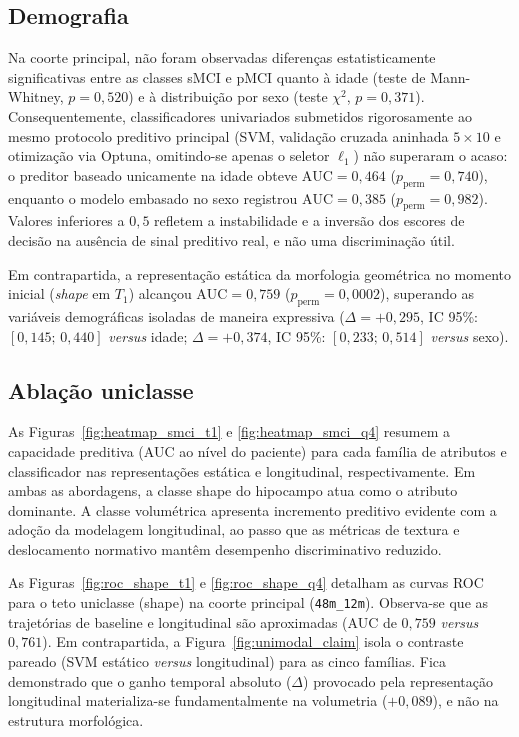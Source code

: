 \documentclass[review]{elsarticle}
\newcommand{\code}[1]{\texttt{#1}}
\begin{document}
	\subsection{Demografia}
	\label{subsec:demo}
	
	Na coorte principal, não foram observadas diferenças estatisticamente significativas entre as classes sMCI e pMCI quanto à idade (teste de Mann-Whitney, $p=0{,}520$) e à distribuição por sexo (teste $\chi^2$, $p=0{,}371$). Consequentemente, classificadores univariados submetidos rigorosamente ao mesmo protocolo preditivo principal (SVM, validação cruzada aninhada $5\times 10$ e otimização via Optuna, omitindo-se apenas o seletor $\ell_1$) não superaram o acaso: o preditor baseado unicamente na idade obteve $\mathrm{AUC}=0{,}464$ ($p_{\mathrm{perm}}=0{,}740$), enquanto o modelo embasado no sexo registrou $\mathrm{AUC}=0{,}385$ ($p_{\mathrm{perm}}=0{,}982$). Valores inferiores a $0{,}5$ refletem a instabilidade e a inversão dos escores de decisão na ausência de sinal preditivo real, e não uma discriminação útil.
	
	Em contrapartida, a representação estática da morfologia geométrica no momento inicial (\emph{shape} em $T_1$) alcançou $\mathrm{AUC}=0{,}759$ ($p_{\mathrm{perm}}=0{,}0002$), superando as variáveis demográficas isoladas de maneira expressiva ($\Delta = +0{,}295$, IC 95\%: $[0{,}145;\,0{,}440]$ \emph{versus} idade; $\Delta = +0{,}374$, IC 95\%: $[0{,}233;\,0{,}514]$ \emph{versus} sexo).
	
	\subsection{Ablação uniclasse}\label{subsec:unimodal-claim}
	
	As Figuras~\ref{fig:heatmap_smci_t1} e \ref{fig:heatmap_smci_q4} resumem a capacidade preditiva (AUC ao nível do paciente) para cada família de atributos e classificador nas representações estática e longitudinal, respectivamente. Em ambas as abordagens, a classe shape do hipocampo atua como o atributo dominante. A classe volumétrica apresenta incremento preditivo evidente com a adoção da modelagem longitudinal, ao passo que as métricas de textura e deslocamento normativo mantêm desempenho discriminativo reduzido.
	
	As Figuras~\ref{fig:roc_shape_t1} e \ref{fig:roc_shape_q4} detalham as curvas ROC para o teto uniclasse (shape) na coorte principal (\code{48m\_12m}). Observa-se que as trajetórias de baseline e longitudinal são aproximadas (AUC de $0{,}759$ \emph{versus} $0{,}761$). Em contrapartida, a Figura~\ref{fig:unimodal_claim} isola o contraste pareado (SVM estático \emph{versus} longitudinal) para as cinco famílias. Fica demonstrado que o ganho temporal absoluto ($\Delta$) provocado pela representação longitudinal materializa-se fundamentalmente na volumetria ($+0{,}089$), e não na estrutura morfológica.
	
\end{document}
